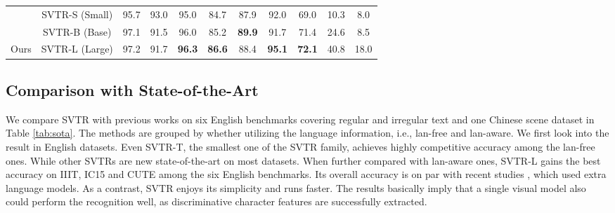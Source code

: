 \documentclass{article}
\begin{document}
\begin{table*}[ht]
{\begin{tabular}{c|r|ccc|ccc|c|cc}
\\
                                
                                & \multicolumn{1}{c|}{SVTR-S (Small)}     & 95.7                                & 93.0                                   & 95.0                                   & 84.7                                   & 87.9                                   & 92.0                                   & 69.0                                   & 10.3                                  & 8.0                       \\
                            & \multicolumn{1}{c|}{SVTR-B (Base)}     & 97.1                                 & 91.5                                 & 96.0                                   & 85.2                            &\textbf{89.9}                               & 91.7                                 & 71.4                                   & 24.6                    &     8.5                     \\
\multirow{-4}{*}{Ours}          

                            & \multicolumn{1}{c|}{SVTR-L (Large)}     & {97.2}                           & 91.7                                 &  \textbf{96.3} & \textbf{86.6} & 88.4                                 & \textbf{95.1} & {\textbf{72.1}} & 40.8                    & 18.0                      \\
\bottomrule
\end{tabular}}
\caption{Results on six English and one Chinese benchmarks tested against existing methods, where  and  are from the reproduction of CombBest \protect\cite{Baek2019WhatIW}.  means language and * means the language-free version of the corresponding method. The speed is the inference time on one NVIDIA 1080Ti GPU averaged over 3000 English image text.}
\label{tab:sota}
\end{table*}


\subsection{Comparison with State-of-the-Art}



We compare SVTR with previous works on six English benchmarks covering regular and irregular text and one Chinese scene dataset in Table \ref{tab:sota}. The methods are grouped by whether utilizing the language information, i.e., lan-free and lan-aware. We first look into the result in English datasets. Even SVTR-T, the smallest one of the SVTR family, achieves highly competitive accuracy among the lan-free ones. While other SVTRs are new state-of-the-art on most datasets. When further compared with lan-aware ones, SVTR-L gains the best accuracy on IIIT, IC15 and CUTE among the six English benchmarks. Its overall accuracy is on par with recent studies \cite{fang2021abinet,tang2021vst}, which used extra language models. As a contrast, SVTR enjoys its simplicity and runs faster. The results basically imply that a single visual model also could perform the recognition well, as discriminative character features are successfully extracted.
\end{document}
